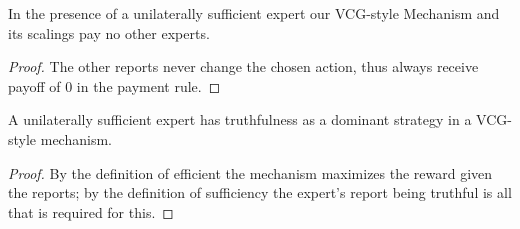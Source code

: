 \begin{lem}
	In the presence of a unilaterally sufficient expert our VCG-style Mechanism and its scalings pay no other experts.
\end{lem}

\begin{proof}
    The other reports never change the chosen action, thus always receive payoff of 0 in the payment rule.
\end{proof}


\begin{lem}
	A unilaterally sufficient expert has truthfulness as a dominant strategy in a VCG-style mechanism.
\end{lem}

\begin{proof}
    By the definition of efficient the mechanism maximizes the reward given the reports; by the definition of sufficiency the expert's report being truthful is all that is required for this.
\end{proof}





